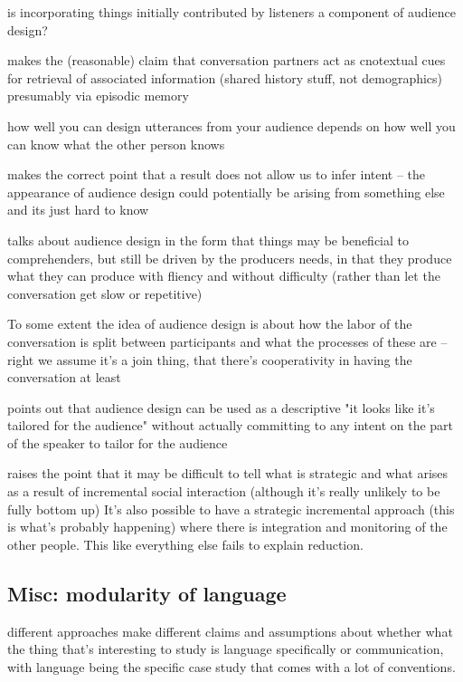 \documentclass[]{article}
\begin{document}
is incorporating things initially contributed by listeners a component of audience design? 

\cite{horton2005} makes the (reasonable) claim that conversation partners act as cnotextual cues for retrieval of associated information (shared history stuff, not demographics) presumably via episodic memory 

\cite{horton2005} how well you can design utterances from your audience depends on how well you can know what the other person knows

\cite{horton1996} makes the correct point that a result does not allow us to infer intent -- the appearance of audience design could potentially be arising from something else and its just hard to know

\cite{macdonald2013} talks about audience design in the form that things may be beneficial to comprehenders, but still be driven by the producers needs, in that they produce what they can produce with fliency and without difficulty (rather than let the conversation get slow or repetitive) 

To some extent the idea of audience design is about how the labor of the conversation is split between participants and what the processes of these are -- right we assume it's a join thing, that there's cooperativity in having the conversation at least 

\cite{rogers2013} points out that audience design can be used as a descriptive "it looks like it's tailored for the audience" without actually committing to any intent on the part of the speaker to tailor for the audience 

\cite{rogers2013} raises the point that it may be difficult to tell what is strategic and what arises as a result of incremental social interaction (although it's really unlikely to be fully bottom up) It's also possible to have a strategic incremental approach (this is what's probably happening) where there is integration and monitoring of the other people. This like everything else fails to explain reduction. 

\subsection{Misc: modularity of language}
different approaches make different claims and assumptions about whether what the thing that's interesting to study is language specifically or communication, with language being the specific case study that comes with a lot of conventions. 
\end{document}
